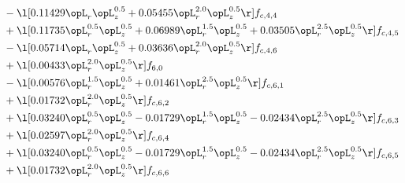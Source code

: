 \begin{alignat}{2}
& - \l[  0.11429 \opL_r \opL_z^{0.5} +  0.05455 \opL_r^{2.0} \opL_z^{0.5}  \r] f_{c,4,4} \nonumber \\ 
& + \l[  0.11735 \opL_r^{0.5} \opL_z^{0.5} +  0.06989 \opL_r^{1.5} \opL_z^{0.5} +  0.03505 \opL_r^{2.5} \opL_z^{0.5}  \r] f_{c,4,5} \nonumber \\ 
& - \l[  0.05714 \opL_r \opL_z^{0.5} +  0.03636 \opL_r^{2.0} \opL_z^{0.5}  \r] f_{c,4,6} \nonumber \\ 
& + \l[  0.00433 \opL_r^{2.0} \opL_z^{0.5}  \r] f_{6,0} \nonumber \\ 
& - \l[  0.00576 \opL_r^{1.5} \opL_z^{0.5} +  0.01461 \opL_r^{2.5} \opL_z^{0.5}  \r] f_{c,6,1} \nonumber \\ 
& + \l[  0.01732 \opL_r^{2.0} \opL_z^{0.5}  \r] f_{c,6,2} \nonumber \\ 
& + \l[  0.03240 \opL_r^{0.5} \opL_z^{0.5}   -0.01729 \opL_r^{1.5} \opL_z^{0.5}   -0.02434 \opL_r^{2.5} \opL_z^{0.5}  \r] f_{c,6,3} \nonumber \\ 
& + \l[  0.02597 \opL_r^{2.0} \opL_z^{0.5}  \r] f_{c,6,4} \nonumber \\ 
& + \l[  0.03240 \opL_r^{0.5} \opL_z^{0.5}   -0.01729 \opL_r^{1.5} \opL_z^{0.5}   -0.02434 \opL_r^{2.5} \opL_z^{0.5}  \r] f_{c,6,5} \nonumber \\ 
& + \l[  0.01732 \opL_r^{2.0} \opL_z^{0.5}  \r] f_{c,6,6} \nonumber \\ 
\end{alignat} 


